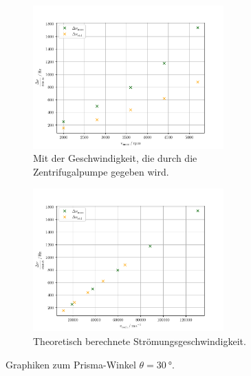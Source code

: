 \begin{figure}
    \centering
    \begin{subfigure}{0.48\textwidth}
        \centering
        \includegraphics[height=5.5cm]{plots/30_2.pdf}
        \caption{Mit der Geschwindigkeit, die durch die Zentrifugalpumpe gegeben wird.}
        \label{fig:exp30}
    \end{subfigure}
    \begin{subfigure}{0.48\textwidth}
        \centering
        \includegraphics[height=5.5cm]{plots/30_1.pdf}
        \caption{Theoretisch berechnete Strömungsgeschwindigkeit.}
        \label{fig:theo30}
    \end{subfigure}
    \caption{Graphiken zum Prisma-Winkel $\theta=\SI{30}{\degree}$.}
    \label{fig:30}
\end{figure}
